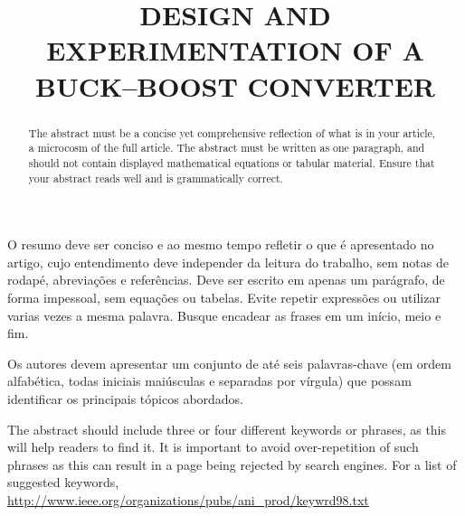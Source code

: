 \title{DESIGN AND EXPERIMENTATION OF A BUCK--BOOST CONVERTER} %

\maketitle




\begin{resumo}  O resumo deve ser conciso e ao mesmo tempo refletir o que é apresentado no artigo, cujo entendimento deve independer da leitura do trabalho, sem notas de rodapé, abreviações e referências. Deve ser escrito em apenas um parágrafo, de forma impessoal, sem equações ou tabelas. Evite repetir expressões ou utilizar varias vezes a mesma palavra. Busque encadear as frases em um início, meio e fim.
\end{resumo}

\begin{palavraschave }
		Os autores devem apresentar um conjunto de até seis palavras-chave (em ordem alfabética, todas iniciais maiúsculas e separadas por vírgula) que possam identificar os principais tópicos abordados.	
\end{palavraschave }

\englishtitle

\begin{abstract}
	The abstract must be a concise yet comprehensive reflection of what is in your article, a microcosm of the full article. The abstract must be written as one paragraph, and should not contain displayed mathematical equations or tabular material.  Ensure that your abstract reads well and is grammatically correct.
\end{abstract}

\begin{keywords}
	The abstract should include three or four different keywords or phrases, as this will help readers to find it. It is important to avoid over-repetition of such phrases as this can result in a page being rejected by search engines. For a list of suggested keywords, \url{http://www.ieee.org/organizations/pubs/ani_prod/keywrd98.txt}
\end{keywords}

